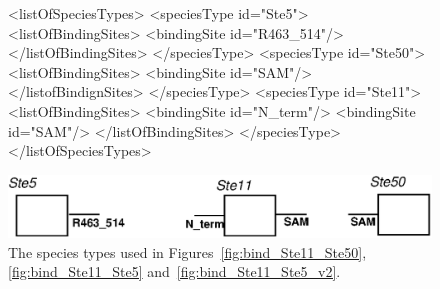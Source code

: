 \documentclass{cekarticle}
\begin{document}
\begin{figure}[h]
\begin{example}
<listOfSpeciesTypes>
    <speciesType id="Ste5">
        <listOfBindingSites>
            <bindingSite id="R463_514"/>
        </listOfBindingSites>
    </speciesType>
    <speciesType id="Ste50">
        <listOfBindingSites>
            <bindingSite id="SAM"/>
        </listofBindignSites>
    </speciesType>
    <speciesType id="Ste11">
        <listOfBindingSites>
            <bindingSite id="N_term"/>
            <bindingSite id="SAM"/>
        </listOfBindingSites>
    </speciesType>
</listOfSpeciesTypes>
\end{example}
  \vspace*{8pt}
  \centering
  \includegraphics[scale = 0.7]{non_exclusive_binding_types.eps}
  \caption{The species types used in Figures~\ref{fig:bind_Ste11_Ste50}, \ref{fig:bind_Ste11_Ste5}
  and~\ref{fig:bind_Ste11_Ste5_v2}.}
  \label{fig:non_exclusive_binding_types}
\end{figure}
\end{document}
